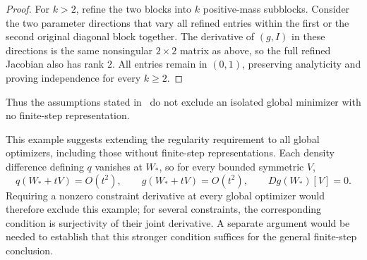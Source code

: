 \begin{proof}
For $k>2$, refine the two blocks into $k$ positive-mass subblocks.
Consider the two parameter directions that vary all refined entries
within the first or the second original diagonal block together.
The derivative of $(g,I)$ in these directions is the same nonsingular
$2\times2$ matrix as above, so the full refined Jacobian also has rank $2$.
All entries remain in $(0,1)$, preserving analyticity and proving
independence for every $k\ge2$.
\end{proof}

Thus the assumptions stated in~\cite[Theorem~5.25]{AlvaradoRamonWang2026}
do not exclude an isolated global minimizer with no finite-step representation.

This example suggests extending the regularity requirement to all global
optimizers, including those without finite-step representations.
Each density difference defining $q$ vanishes at $W_*$, so for every
bounded symmetric $V$,
\[
  q(W_*+tV)=O(t^2),\qquad g(W_*+tV)=O(t^2),\qquad Dg(W_*)[V]=0.
\]
Requiring a nonzero constraint derivative at every global optimizer would
therefore exclude this example; for several constraints, the corresponding
condition is surjectivity of their joint derivative.
A separate argument would be needed to establish that this stronger
condition suffices for the general finite-step conclusion.
